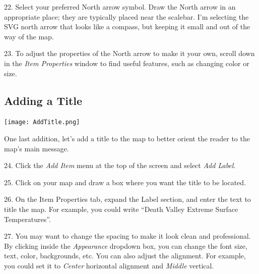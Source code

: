 \documentclass[oneside,a4paper,11pt,explicit]{book}
\begin{document}
22. Select your preferred North arrow symbol. Draw the North arrow in an appropriate place; they are typically placed near the scalebar. I'm selecting the SVG north arrow that looks like a compass, but keeping it small and out of the way of the map.


23. To adjust the properties of the North arrow to make it your own, scroll down in the \textit{Item Properties} window to find useful features, such as changing color or size. 

\subsection{Adding a Title}

\centerline{\texttt{[image: AddTitle.png]}}

One last addition, let's add a title to the map to better orient the reader to the map's main message. 

24. Click the \textit{Add Item} menu at the top of the screen and select \textit{Add Label}.

25. Click on your map and draw a box where you want the title to be located. 

26. On the Item Properties tab, expand the Label section, and enter the text to title the map. For example, you could write ``Death Valley Extreme Surface Temperatures''.

27. You may want to change the spacing to make it look clean and professional. By clicking inside the \textit{Appearance} dropdown box, you can change the font size, text, color, backgrounds, etc. You can also adjust the alignment. For example, you could set it to \textit{Center} horizontal alignment and \textit{Middle} vertical.
\end{document}
